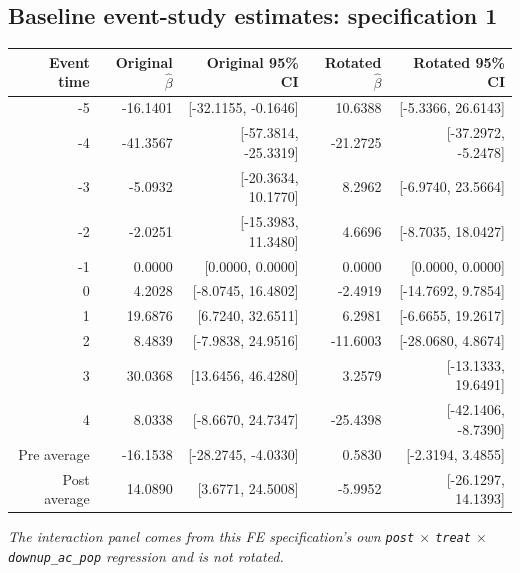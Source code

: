 \documentclass[10pt]{article}
\begin{document}
\subsection*{Baseline event-study estimates: specification 1}
\begin{center}
\scriptsize
\begin{tabular}{r rr rr}
\toprule
Event time & Original $\hat\beta$ & Original 95\% CI & Rotated $\hat\beta$ & Rotated 95\% CI \\
\midrule
-5 & -16.1401 & [-32.1155, -0.1646] & 10.6388 & [-5.3366, 26.6143] \\
-4 & -41.3567 & [-57.3814, -25.3319] & -21.2725 & [-37.2972, -5.2478] \\
-3 & -5.0932 & [-20.3634, 10.1770] & 8.2962 & [-6.9740, 23.5664] \\
-2 & -2.0251 & [-15.3983, 11.3480] & 4.6696 & [-8.7035, 18.0427] \\
-1 & 0.0000 & [0.0000, 0.0000] & 0.0000 & [0.0000, 0.0000] \\
0 & 4.2028 & [-8.0745, 16.4802] & -2.4919 & [-14.7692, 9.7854] \\
1 & 19.6876 & [6.7240, 32.6511] & 6.2981 & [-6.6655, 19.2617] \\
2 & 8.4839 & [-7.9838, 24.9516] & -11.6003 & [-28.0680, 4.8674] \\
3 & 30.0368 & [13.6456, 46.4280] & 3.2579 & [-13.1333, 19.6491] \\
4 & 8.0338 & [-8.6670, 24.7347] & -25.4398 & [-42.1406, -8.7390] \\
\midrule
Pre average & -16.1538 & [-28.2745, -4.0330] & 0.5830 & [-2.3194, 3.4855] \\
Post average & 14.0890 & [3.6771, 24.5008] & -5.9952 & [-26.1297, 14.1393] \\
\bottomrule
\end{tabular}
\end{center}
\medskip
\textit{The interaction panel comes from this FE specification's own \texttt{post} $\times$ \texttt{treat} $\times$ \texttt{downup\_ac\_pop} regression and is not rotated.}
\clearpage
\end{document}
